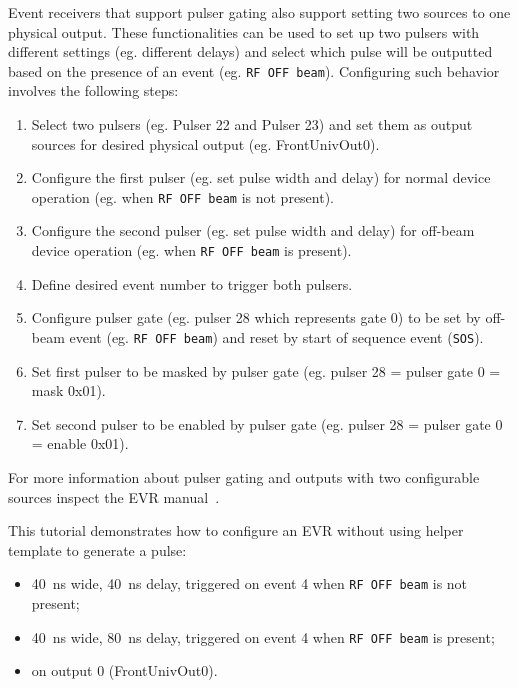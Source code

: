 \documentclass[12pt,a4paper]{article}
\begin{document}
Event receivers that support pulser gating also support setting two sources to one physical output. These functionalities can be used to set up two pulsers with different settings (eg. different delays) and select which pulse will be outputted based on the presence of an event (eg. \texttt{RF OFF beam}). Configuring such behavior involves the following steps:
\begin{enumerate}
\item Select two pulsers (eg. Pulser 22 and Pulser 23) and set them as output sources for desired physical output (eg. FrontUnivOut0). \label{mps_steps:selectPulsers}
\item Configure the first pulser (eg. set pulse width and delay) for normal device operation (eg. when \texttt{RF OFF beam} is not present). \label{mps_steps:configurePulser1}
\item Configure the second pulser (eg. set pulse width and delay) for off-beam device operation (eg. when \texttt{RF OFF beam} is present). \label{mps_steps:configurePulser2}
\item Define desired event number to trigger both pulsers.  \label{mps_steps:triggerEvent}
\item Configure pulser gate (eg. pulser 28 which represents gate 0) to be set by off-beam event (eg. \texttt{RF OFF beam}) and reset by start of sequence event (\texttt{SOS}). \label{mps_steps:setupGate}
\item Set first pulser to be masked by pulser gate (eg. pulser 28 = pulser gate 0 = mask 0x01). \label{mps_steps:setPulserMask}
\item Set second pulser to be enabled by pulser gate (eg. pulser 28 = pulser gate 0 = enable 0x01). \label{mps_steps:setPulserEnable}
\end{enumerate}
For more information about pulser gating and outputs with two configurable sources inspect the EVR manual~\cite{evr_manual}.

This tutorial demonstrates how to configure an EVR without using helper template to generate a pulse:
\begin{itemize}
\item 40~ns wide, 40~ns delay, triggered on event 4 when \texttt{RF OFF beam} is not present;
\item 40~ns wide, 80~ns delay, triggered on event 4 when \texttt{RF OFF beam} is present;
\item on output 0 (FrontUnivOut0).
\end{itemize}
\end{document}
